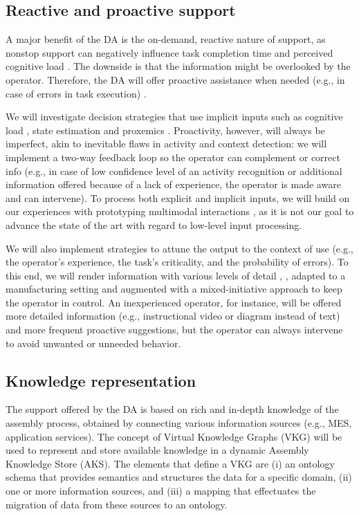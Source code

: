 \subsection{Reactive and proactive support} \label{sec:ReactiveProactive}

A major benefit of the DA is the on-demand, reactive nature of support, as nonstop support can negatively influence task completion time and perceived cognitive load \cite{funk2017WorkingAugmentedReality}. The downside is that the information might be overlooked by the operator. Therefore, the DA will offer proactive assistance when needed (e.g., in case of errors in task execution) \cite{cuenca2016HasseltRapidPrototyping}. 

We will investigate decision strategies that use implicit inputs such as cognitive load \cite{lindlbauer2019ContextAwareOnlineAdaptation}, state estimation and proxemics \cite{Marquardt_2015} \cite{Williamson_2022}. Proactivity, however, will always be imperfect, akin to inevitable flaws in activity and context detection: we will implement a two-way feedback loop so the operator can complement or correct info (e.g., in case of low confidence level of an activity recognition or additional information offered because of a lack of experience, the operator is made aware and can intervene). 
To process both explicit and implicit inputs, we will build on our experiences with prototyping multimodal interactions \cite{eshet2016ContextUseFinal}, as it is not our goal to advance the state of the art with regard to low-level input processing. 

We will also implement strategies to attune the output to the context of use (e.g., the operator's experience, the task's criticality, and the probability of errors). To this end, we will render information with various levels of detail \cite{Mezhoudi2015AnAA}, \cite{10.1145/3332165.3347945}, adapted to a manufacturing setting and augmented with a mixed-initiative approach to keep the operator in control. An inexperienced operator, for instance, will be offered more detailed information (e.g., instructional video or diagram instead of text) and more frequent proactive suggestions, but the operator can always intervene to avoid unwanted or unneeded behavior.

\subsection{Knowledge representation}

The support offered by the DA is based on rich and in-depth knowledge of the assembly process, obtained by connecting various information sources (e.g., MES, application services). The concept of Virtual Knowledge Graphs (VKG) \cite{xiao2019VirtualKnowledgeGraphs} will be used to represent and store available knowledge in a dynamic Assembly Knowledge Store (AKS). The elements that define a VKG are (i) an ontology schema that provides semantics and structures the data for a specific domain, (ii) one or more information sources, and (iii) a mapping that effectuates the migration of data from these sources to an ontology. 

